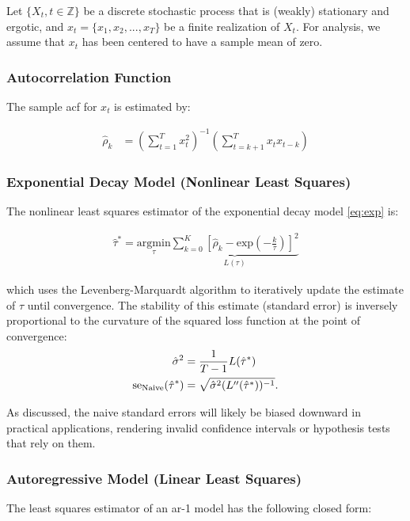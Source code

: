 \documentclass[main.tex]{subfiles}
\begin{document}
Let $\{X_t, t\in \mathbb{Z}\}$ be a discrete stochastic process that is (weakly) stationary and ergotic, and $x_t = \{x_1, x_2, ..., x_T\}$ be a finite realization of $X_t$. For analysis, we assume that $x_t$ has been centered to have a sample mean of zero.

\subsubsection{Autocorrelation Function}

The sample acf for $x_t$ is estimated by:

\begin{align}
\hat\rho_k &= (\sum_{t=1}^T x_t^2)^{-1} (\sum_{t=k+1}^{T}x_t x_{t-k})
\end{align}

\subsubsection{Exponential Decay Model (Nonlinear Least Squares)}
The nonlinear least squares estimator of the exponential decay model \eqref{eq:exp} is:

\begin{align}
    \hat\tau^* = \underset{\tau}{\text{argmin}} \underbrace{\sum_{k=0}^K [\hat\rho_k - \text{exp}(-\frac{k}{\tau})]^2}_{L(\tau)}
\end{align}

which uses the Levenberg-Marquardt \cite{watson_levenberg-marquardt_1978} algorithm to iteratively update the estimate of $\tau$ until convergence. The stability of this estimate (standard error) is inversely proportional to the curvature of the squared loss function at the point of convergence:
\begin{align}
    \hat\sigma^2 &= \frac{1}{T-1} L(\hat\tau^*) \notag\\
    \text{se}_\text{Naive}(\hat\tau^*) &= \sqrt{\hat\sigma^2 (L''(\hat\tau^*))^{-1}}.
\end{align}

As discussed, the naive standard errors will likely be biased downward in practical applications, rendering invalid confidence intervals or hypothesis tests that rely on them.

\subsubsection{Autoregressive Model (Linear Least Squares)}
The least squares estimator of an ar-1 model has the following closed form:
\end{document}
